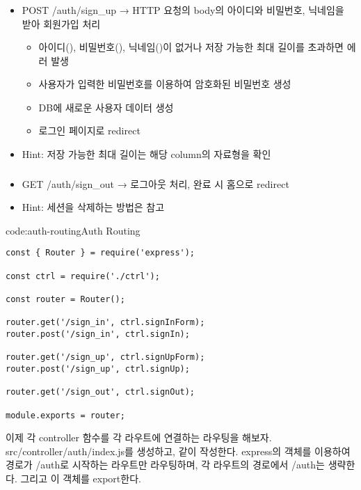 \subsubsection*{}
\begin{itemize}
    \item POST /auth/sign\_up → HTTP 요청의 body의 아이디와 비밀번호, 닉네임을 받아 회원가입 처리
    \begin{itemize}
        \item 아이디(), 비밀번호(), 닉네임()이 없거나 저장 가능한 최대 길이를 초과하면  에러 발생
        \item 사용자가 입력한 비밀번호를 이용하여 암호화된 비밀번호 생성
        \item DB에 새로운 사용자 데이터 생성
        \item 로그인 페이지로 redirect
    \end{itemize}
    \item Hint: 저장 가능한 최대 길이는 해당 column의 자료형을 확인
\end{itemize}

\subsubsection*{}
\begin{itemize}
    \item GET /auth/sign\_out → 로그아웃 처리, 완료 시 홈으로 redirect
    \item Hint: 세션을 삭제하는 방법은  참고
\end{itemize}

\begin{code}{code:auth-routing}{Auth Routing}
\begin{verbatim}
const { Router } = require('express');

const ctrl = require('./ctrl');

const router = Router();

router.get('/sign_in', ctrl.signInForm);
router.post('/sign_in', ctrl.signIn);

router.get('/sign_up', ctrl.signUpForm);
router.post('/sign_up', ctrl.signUp);

router.get('/sign_out', ctrl.signOut);

module.exports = router;
\end{verbatim}
\end{code}

이제 각 controller 함수를 각 라우트에 연결하는 라우팅을 해보자. src/controller/auth/index.js를 생성하고, \과 같이 작성한다. \은 express의  객체를 이용하여 경로가 /auth로 시작하는 라우트만 라우팅하며, 각 라우트의 경로에서 /auth는 생략한다. 그리고 이  객체를 export한다.

